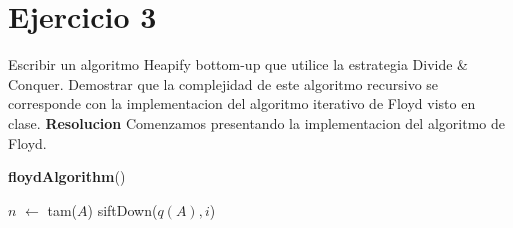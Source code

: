 \documentclass[10pt,a4paper]{article}
\begin{document}
\section{Ejercicio 3}

Escribir un algoritmo Heapify bottom-up que utilice la estrategia Divide \& Conquer. Demostrar que la complejidad de este algoritmo recursivo se corresponde con la implementacion del algoritmo iterativo de Floyd visto en clase.
\newline
\newline
\textbf{Resolucion}
\newline
\newline
Comenzamos presentando la implementacion del algoritmo de Floyd.

\begin{algorithm}[H]{\textbf{floydAlgorithm}()}
	\begin{algorithmic}[1]
		\State $n$ $\gets$ tam($A$)                               
		\State siftDown($q(A),i$)                                    
		\EndFor
		\medskip
	\end{algorithmic}
\end{algorithm}
\end{document}
